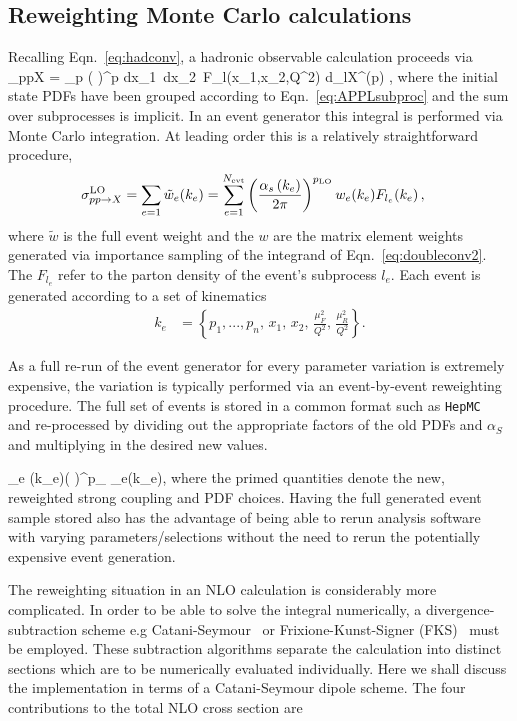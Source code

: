 \subsection{Reweighting Monte Carlo calculations}
Recalling Eqn.~\ref{eq:hadconv}, a hadronic observable calculation proceeds via
\be  \sigma_{pp\to X} = \sum_p \left(  \right)^{p} \int dx_1\, dx_2\,  F_l(x_1,x_2,Q^2)\; d\hat{\sigma}_{l\to X}^{(p)}\; , \label{eq:doubleconv2} \ee
where the initial state PDFs have been grouped according to Eqn.~\ref{eq:APPLsubproc} and the sum over subprocesses is implicit. In an event generator this integral is performed via Monte Carlo integration. At leading order this is a relatively straightforward procedure,
\begin{align}
  \label{eq:basicMC}
  \sigma_{pp\to X}^{\text{LO}} &= \sum_{e=1} \tilde{w}_e(k_e) = \sum_{e=1}^{N_{\mathrm{evt}}} \left(  {{\alpha_s\left(k_e\right)}\over {2\pi}} \right)^{p_{\text{LO}}} w_e(k_e) F_{l_e}(k_e)\, ,
\end{align}
where $\tilde{w}$ is the full event weight and the $w$ are the matrix element weights generated via importance sampling of the integrand of Eqn.~\ref{eq:doubleconv2}. The $F_{l_e}$ refer to the parton density of the event's subprocess $l_e$. Each event is generated according to a set of kinematics
\begin{align}
  k_e &= \left\{p_1, ..., p_n,\,x_1,\,x_2,\,\frac{\mu_F^2}{Q^2},\,\frac{\mu_R^2}{Q^2} \right\}.
\end{align}

As a full re-run of the event generator for every parameter variation is extremely expensive, the variation is typically performed via an event-by-event reweighting procedure. The full set of events is stored
in a common format such as { \tt HepMC}~\cite{Dobbs:2001ck} and re-processed by dividing out the appropriate factors of the old PDFs and $\alpha_S$ and multiplying in the desired new values. 

\be {}_e (k_e)\to \left(   \right)^{p_{}}  \; _e(k_e), \ee
where the primed quantities denote the new, reweighted strong coupling and PDF choices. Having the full generated event sample stored also has the advantage of being able to rerun analysis software with varying parameters/selections without the need to rerun the potentially expensive event generation.

The reweighting situation in an NLO calculation is considerably more complicated. In order to be able to solve the integral numerically, a divergence-subtraction scheme e.g Catani-Seymour~\cite{Catani:1996vz}
or Frixione-Kunst-Signer (FKS)~\cite{Frixione:1995ms,Frixione:1997np} must be employed. These subtraction algorithms separate the calculation into distinct sections which are to be numerically evaluated individually. Here we shall discuss the implementation in terms of a Catani-Seymour dipole scheme. The four contributions to the total NLO cross section are 

